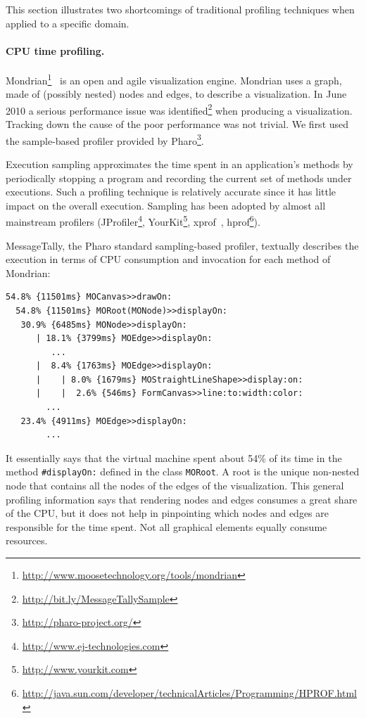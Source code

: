 \documentclass[runningheads]{llncs}
\newcommand{\ct}{\lstinline[backgroundcolor=\color{white},basicstyle=\footnotesize\ttfamily]}
\newcommand{\ugh}[1]{\textcolor{red}{\uwave{#1}}} %
\newcommand{\on}[1]{\nb{Oscar}{olive}{#1}}
\begin{document}
This section illustrates two shortcomings of traditional profiling techniques when applied to a specific domain.\\

\paragraph{CPU time profiling.}
Mondrian\footnote{\url{http://www.moosetechnology.org/tools/mondrian}}~\cite{Meye06a} is an open and agile visualization engine. 
Mondrian uses a graph, made of (possibly nested) nodes and edges, to describe a visualization. 
In June 2010 a serious performance issue was identified\footnote{\url{http://bit.ly/MessageTallySample}} when producing a visualization.
Tracking down the cause of the poor performance was not trivial. We first used the sample-based profiler provided by Pharo\footnote{\url{http://pharo-project.org/}}.

Execution sampling approximates the time spent in an application's methods by periodically stopping a program and recording the current set of methods under executions. Such a profiling technique is relatively accurate since it has little impact on the overall execution.
Sampling has been adopted by almost all mainstream profilers (JProfiler\footnote{\url{http://www.ej-technologies.com}}, YourKit\footnote{\url{http://www.yourkit.com}}, xprof~\cite{Gupt92a}, hprof\footnote{\url{http://java.sun.com/developer/technicalArticles/Programming/HPROF.html}}).


MessageTally, the Pharo standard sampling-based profiler, textually describes the execution in terms of CPU consumption and invocation for each method of Mondrian:

\begin{lstlisting}
54.8% {11501ms} MOCanvas>>drawOn: 
  54.8% {11501ms} MORoot(MONode)>>displayOn: 
   30.9% {6485ms} MONode>>displayOn: 
      | 18.1% {3799ms} MOEdge>>displayOn: 
         ...    
      |  8.4% {1763ms} MOEdge>>displayOn: 
      |    | 8.0% {1679ms} MOStraightLineShape>>display:on: 
      |    |  2.6% {546ms} FormCanvas>>line:to:width:color: 
        ...    
   23.4% {4911ms} MOEdge>>displayOn:     
        ...    
\end{lstlisting}

It essentially says that the virtual machine spent about 54\% of its time in the method \ct{#displayOn:} defined in the class \ct{MORoot}. A root is the unique non-nested node that contains all the nodes of the edges of the visualization. This general profiling information says that rendering nodes and edges consumes a great share of the CPU, but it does not help in pinpointing which nodes and edges are responsible for the time spent. Not all graphical elements equally consume resources.
\end{document}
